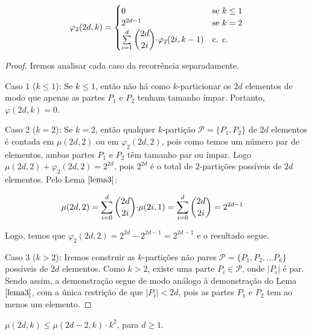 \documentclass[12pt]{article}
\begin{document}
{\begin{lema}    
	\label{lema4}
	\begin{equation}
		\varphi_2(2d, k) =
		\begin{cases}
			0 & \text{se $k \leq 1$}\\
			2^{2d - 1} & \text{se $k = 2$} \\
			\sum\limits_{i = 1}^{d} \escolhe{2d}{2i} {\cdot} \varphi_2(2i, k-1) & \text{c. c.} \\ 
		\end{cases}
	\end{equation} 
\end{lema}

\begin{proof} 
	Iremos analisar cada caso da recorrência separadamente. \newl
	
	Caso 1 ($k \leq 1$): Se $k \leq 1$, então não há como $k$-particionar os $2d$ elementos de modo que apenas as partes $P_1$ e $P_2$ tenham tamanho ímpar. Portanto, $\varphi(2d, k) = 0$. \newl
	
	Caso 2 ($k = 2$): Se $k = 2$, então qualquer $k$-partição $\mathcal{P} = \{P_1, P_2\}$ de $2d$ elementos é contada em $\mu(2d, 2)$ ou em $\varphi_2(2d, 2)$, pois como temos um número par de elementos, ambas partes $P_1$ e $P_2$ têm tamanho par ou ímpar. Logo $\mu(2d, 2) + \varphi_2(2d, 2) = 2^{2d}$, pois $2^{2d}$ é o total de $2$-partições possíveis de $2d$ elementos. Pelo Lema $\ref{lema3}$:
	
	\begin{align}
		\begin{split}
			\mu(2d, 2) &= \sum\limits_{i = 0}^{d}\escolhe{2d}{2i} {\cdot} \mu(2i, 1) = \sum\limits_{i = 0}^{d}\escolhe{2d}{2i} = 2^{2d-1}
		\end{split} 
	\end{align} 
	
	Logo, temos que $\varphi_2(2d, 2)  = 2^{2d} - 2^{2d - 1} = 2^{2d - 1}$ e o resultado segue. \newl
	
	
	Caso 3 ($k > 2$): Iremos construir as $k$-partições não pares $\mathcal{P} = \{P_1, P_2, \ldots P_k\}$ possíveis de $2d$ elementos. Como $k > 2$, existe uma parte $P_i \in \mathcal{P}$, onde $|P_i|$ é par. Sendo assim, a demonstração segue de modo análogo à demonstração do Lema $\ref{lema3}$, com a única restrição de que $|P_i| < 2d$, pois as partes $P_1$ e $P_2$ tem ao menos um elemento.
\end{proof} \newl
  

\begin{lema} 
	\label{lema5} 
	$\mu(2d, k) \leq \mu(2d - 2, k) {\cdot} k^{2}$, para $d \geq 1$.
\end{lema}

}
\end{document}
